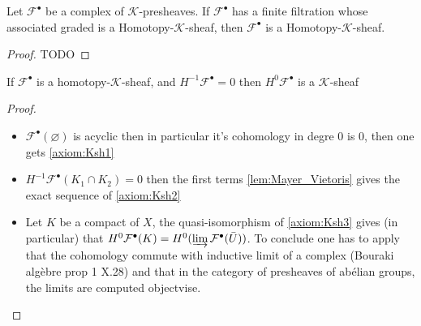 \begin{lemma}\label{lem:homotpy_k_sheaves_stable_by_extension}
    Let $\mathcal{F}^{\bullet}$ be a complex of $\mathcal{K}$-presheaves. If $\mathcal{F}^{\bullet}$ has a finite filtration whose associated graded is a Homotopy-$\mathcal{K}$-sheaf, then $\mathcal{F}^{\bullet}$ is a Homotopy-$\mathcal{K}$-sheaf.
\end{lemma}

\begin{proof}
    TODO
\end{proof}

\begin{lemma}\label{lem:first_non_zero_homology_of_homotopy_k_sheaf_is_k_sheaf}
    If $\mathcal{F}^{\bullet}$ is a homotopy-$\mathcal{K}$-sheaf, and $H^{-1}\mathcal{F}^{\bullet}=0$ then $H^{0}\mathcal{F}^{\bullet}$ is a $\mathcal{K}$-sheaf
\end{lemma}

\begin{proof}
    \begin{itemize}
        \item $\mathcal{F}^{\bullet}(\varnothing)$ is acyclic then in particular it's cohomology in degre $0$ is $0$, then one gets \eqref{axiom:Ksh1}
        \item $H^{-1}\mathcal{F}^{\bullet}(K_1\cap K_2)=0$ then the first terms \ref{lem:Mayer_Vietoris} gives the exact sequence of \eqref{axiom:Ksh2}
        \item Let $K$ be a compact of $X$, the quasi-isomorphism of \eqref{axiom:Ksh3} gives (in particular) that $H^0\mathcal{F}^{\bullet}(K)=H^0(\varinjlim\mathcal{F}^{\bullet}(\bar{U}))$. To conclude one has to apply that the cohomology commute with inductive limit of a complex (Bouraki algèbre prop 1 X.28) and that in the category of presheaves of abélian groups, the limits are computed objectvise.
    \end{itemize}
\end{proof}



